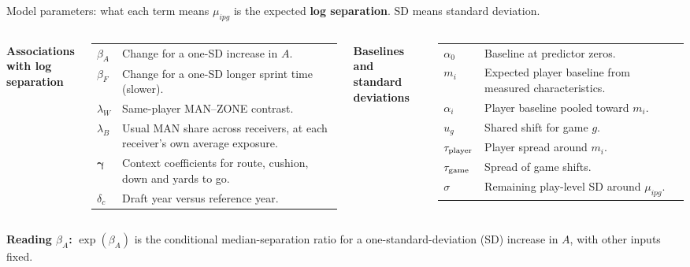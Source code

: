 \documentclass[aspectratio=169,11pt]{beamer}
\renewcommand{\arraystretch}{1.28}
\newcommand{\key}[1]{{\color{teal}\bfseries #1}}
\begin{document}
\begin{frame}{Model parameters: what each term means}
\small
$\mu_{ipg}$ is the expected \textbf{log separation}. SD means standard deviation.
\vspace{3mm}\par
\begin{columns}[T,onlytextwidth]
\key{Associations with log separation}\par\smallskip
{\renewcommand{\arraystretch}{1.12}
\begin{tabular}{@{}P{1.1cm}P{5.9cm}@{}}
$\beta_A$ & Change for a one-SD increase in $A$.\\
$\beta_F$ & Change for a one-SD longer sprint time (slower).\\
$\lambda_W$ & Same-player MAN--ZONE contrast.\\
$\lambda_B$ & Usual MAN share across receivers, at each receiver's own average exposure.\\
$\boldsymbol\gamma$ & Context coefficients for route, cushion, down and yards to go.\\
$\delta_c$ & Draft year versus reference year.\\
\end{tabular}\par}
\key{Baselines and standard deviations}\par\smallskip
{\renewcommand{\arraystretch}{1.12}
\begin{tabular}{@{}P{1.45cm}P{4.65cm}@{}}
$\alpha_0$ & Baseline at predictor zeros.\\
$m_i$ & Expected player baseline from measured characteristics.\\
$\alpha_i$ & Player baseline pooled toward $m_i$.\\
$u_g$ & Shared shift for game $g$.\\
$\tau_{\rm player}$ & Player spread around $m_i$.\\
$\tau_{\rm game}$ & Spread of game shifts.\\
$\sigma$ & Remaining play-level SD around $\mu_{ipg}$.\\
\end{tabular}\par}
\end{columns}
\vspace{2mm}\par
\textbf{Reading $\beta_A$:} $\exp(\beta_A)$ is the conditional median-separation ratio for a one-standard-deviation (SD) increase in $A$, with other inputs fixed.

\end{frame}
\end{document}
